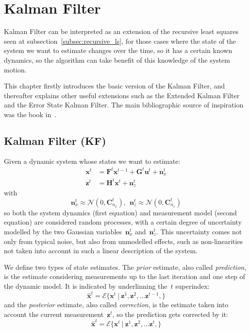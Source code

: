 \section{Kalman Filter}
Kalman Filter can be interpreted as an extension of the recursive least squares seen at subsection~\ref{subsec:recursive_ls}, for those cases where the state of the system we want to estimate changes over the time, so it has a certain known dynamics, so the algorithm can take benefit of this knowledge of the system motion.

This chapter firstly introduces the basic version of the Kalman Filter, and thereafter explains other useful extensions such as the Extended Kalman Filter and the Error State Kalman Filter. The main bibliographic source of inspiration was the book in~\cite{simon06}.

\subsection{Kalman Filter (KF)}
Given a dynamic system whose states we want to estimate:
\begin{align}
\mathbf{x}^t & = \mathbf{F}^t\mathbf{x}^{t-1} + \mathbf{G}^t\mathbf{u}^{t} + \mathbf{n}^t_x \label{eq:dynamic_system_1}\\
\mathbf{z}^t & = \mathbf{H}^t\mathbf{x}^t + \mathbf{n}^t_z \label{eq:dynamic_system_2}
\end{align} 
with 
\begin{equation}
 \mathbf{n}^t_x \approx \mathcal{N}(0,\mathbf{C}^t_{n_x}), \ \ \mathbf{n}^t_z \approx \mathcal{N}(0,\mathbf{C}^t_{n_z})
\end{equation}
so both the system dynamics (first equation) and measurement model (second equation) are considered random processes, with a certain degree of uncertainty modelled by the two Gaussian variables~$\mathbf{n}^t_x$ and~$\mathbf{n}^t_z$. This uncertainty comes not only from typical noise, but also from unmodelled effects, such as non-linearities not taken into account in such a linear description of the system. 

We define two types of state estimates. The \textit{prior} estimate, also called \textit{prediction}, is the estimate considering measurements up to the last iteration and one step of the dynamic model. It is indicated by underlinning the~$t$ superindex:
\begin{equation}
 \hat{\mathbf{x}}^{\underline{t}} = \mathcal{E}\{\mathbf{x}^t\ |\ \mathbf{z}^1,\mathbf{z}^2,\dots \mathbf{z}^{t-1},\}
\end{equation}
and the \textit{posterior} estimate, also called \textit{correction}, is the estimate taken into account the current measurement~$\mathbf{z}^{t}$, so the prediction gets corrected by it:
\begin{equation}
 \hat{\mathbf{x}}^{t} = \mathcal{E}\{\mathbf{x}^t\ |\ \mathbf{z}^1,\mathbf{z}^2,\dots \mathbf{z}^{t},\}
\end{equation}

